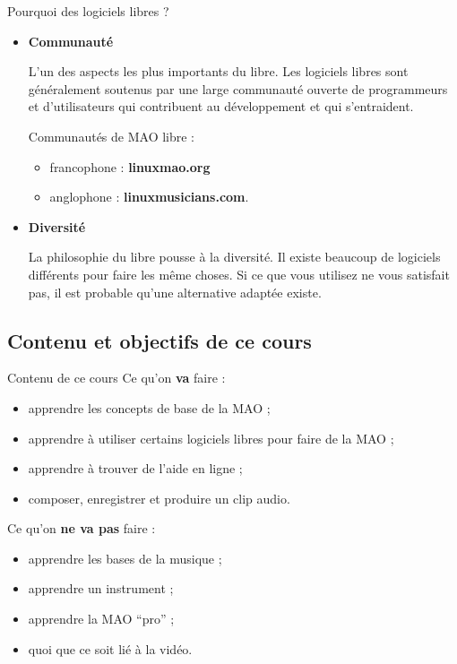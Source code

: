 \documentclass{beamer}
\begin{document}
\begin{frame}{Pourquoi des logiciels libres ?}
  \begin{itemize}
  \item \textbf{Communauté}
  
    L'un des aspects les plus importants du libre. Les logiciels libres sont généralement soutenus par une large communauté ouverte de programmeurs et d'utilisateurs qui contribuent au développement et qui s'entraident.
    
    Communautés de MAO libre :
    \begin{itemize}
    \item francophone : \textbf{linuxmao.org}
    \item anglophone : \textbf{linuxmusicians.com}.
    \end{itemize}
    
  \item \textbf{Diversité}
    
    La philosophie du libre pousse à la diversité. Il existe beaucoup de logiciels différents pour faire les même choses. Si ce que vous utilisez ne vous satisfait pas, il est probable qu'une alternative adaptée existe.
  \end{itemize}
\end{frame}




\subsection{Contenu et objectifs de ce cours}
\begin{frame}{Contenu de ce cours}
  Ce qu'on \textbf{va} faire :
  \begin{itemize}
  \item apprendre les concepts de base de la MAO ;
  \item apprendre à utiliser certains logiciels libres pour faire de la MAO ;
  \item apprendre à trouver de l'aide en ligne ;
  \item composer, enregistrer et produire un clip audio.
  \end{itemize}
  Ce qu'on \textbf{ne va pas} faire :
  \begin{itemize}
  \item apprendre les bases de la musique ;
  \item apprendre un instrument ;
  \item apprendre la MAO ``pro'' ;
  \item quoi que ce soit lié à la vidéo.
  \end{itemize}
\end{frame}
\end{document}
